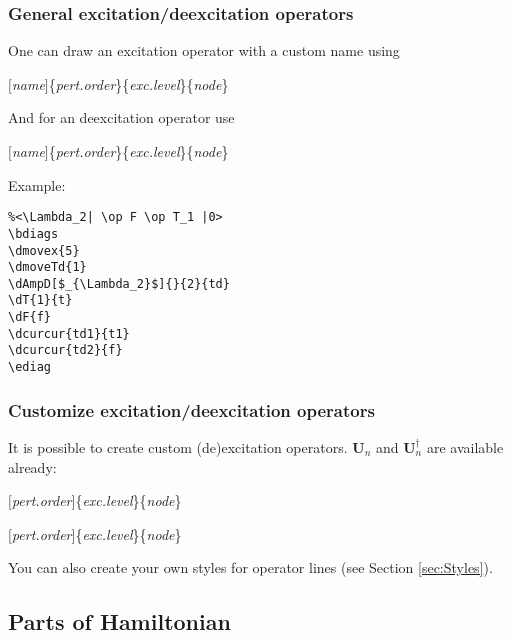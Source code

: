 \documentclass[a4paper]{article}
\newcommand{\myind}{\hspace{10pt}}
\begin{document}
\subsubsection{General excitation/deexcitation operators}

One can draw an excitation operator with a custom name using

\myind{\bf \textbackslash dAmp}$[${\it name}$]$\{{\it pert.order}\}\{{\it exc.level}\}\{{\it node}\}

And for an deexcitation operator use 

\myind{\bf \textbackslash dAmpD}$[${\it name}$]$\{{\it pert.order}\}\{{\it exc.level}\}\{{\it node}\}

Example:

\begin{table}[ht]
 \begin{minipage}[b]{0.5\linewidth}\centering
  \begin{lstlisting}
%<\Lambda_2| \op F \op T_1 |0>
\bdiags
\dmovex{5}
\dmoveTd{1}
\dAmpD[$_{\Lambda_2}$]{}{2}{td}
\dT{1}{t}
\dF{f}
\dcurcur{td1}{t1}
\dcurcur{td2}{f}
\ediag
  \end{lstlisting}
 \end{minipage}
 \begin{minipage}[b]{0.5\linewidth}\centering
\bdiags
{}
\ediag
 \end{minipage}
\end{table}

\subsubsection{Customize excitation/deexcitation operators}

It is possible to create custom (de)excitation operators. ${\mathbf U}_n $ and ${\mathbf U}^\dagger_n $ are 
available already:

\myind{\bf \textbackslash dU}$[${\it pert.order}$]$\{{\it exc.level}\}\{{\it node}\}

\myind{\bf \textbackslash dUd}$[${\it pert.order}$]$\{{\it exc.level}\}\{{\it node}\}

You can also create your own styles for operator lines (see Section \ref{sec:Styles}).

\subsection{Parts of Hamiltonian}
\end{document}
